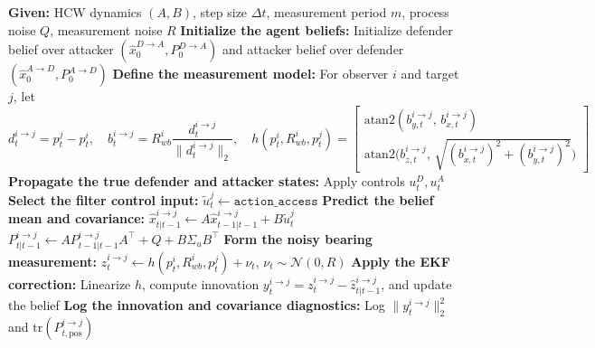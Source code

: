 \begin{algorithm}[H]
\caption{Agent-Centric Bearing-Only Kalman Filter Update}
\label{alg:kf-methodology}
\begin{algorithmic}[1]
\State \textbf{Given:} HCW dynamics $(A,B)$, step size $\Delta t$, measurement period $m$, process noise $Q$, measurement noise $R$
\State \textbf{Initialize the agent beliefs:}
\State \hspace{1em} Initialize defender belief over attacker $(\hat{x}^{D\to A}_0,P^{D\to A}_0)$ and attacker belief over defender $(\hat{x}^{A\to D}_0,P^{A\to D}_0)$
\State \textbf{Define the measurement model:}
\State \hspace{1em} For observer $i$ and target $j$, let
\[
d_t^{i\to j}=p_t^j-p_t^i,\quad
b_t^{i\to j}=R_{wb}^i\frac{d_t^{i\to j}}{\|d_t^{i\to j}\|_2},\quad
h(p_t^i,R_{wb}^i,p_t^j)=
\begin{bmatrix}
\mathrm{atan2}(b_{y,t}^{i\to j},\,b_{x,t}^{i\to j})\\[2pt]
\mathrm{atan2}\!\big(b_{z,t}^{i\to j},\,\sqrt{(b_{x,t}^{i\to j})^2+(b_{y,t}^{i\to j})^2}\big)
\end{bmatrix}
\]
  \State \textbf{Propagate the true defender and attacker states:}
  \State \hspace{1em} Apply controls $u_t^{D},u_t^{A}$
    \State \textbf{Select the filter control input:}
    \State \hspace{1em} $\tilde{u}_t^j\leftarrow \texttt{action\_access}$
    \State \textbf{Predict the belief mean and covariance:}
    \State \hspace{1em} $\hat{x}_{t|t-1}^{i\to j}\leftarrow A\hat{x}_{t-1|t-1}^{i\to j}+B\tilde{u}_t^j$
    \State \hspace{1em} $P_{t|t-1}^{i\to j}\leftarrow A P_{t-1|t-1}^{i\to j} A^\top + Q + B\Sigma_u B^\top$
      \State \textbf{Form the noisy bearing measurement:}
      \State \hspace{1em} $z_t^{i\to j}\leftarrow h(p_t^i,R_{wb}^i,p_t^j)+\nu_t$, $\nu_t\sim\mathcal{N}(0,R)$
      \State \textbf{Apply the EKF correction:}
      \State \hspace{1em} Linearize $h$, compute innovation $y_t^{i\to j}=z_t^{i\to j}-\hat{z}_{t|t-1}^{i\to j}$, and update the belief
      \State \textbf{Log the innovation and covariance diagnostics:}
      \State \hspace{1em} Log $\|y_t^{i\to j}\|_2^2$ and $\mathrm{tr}(P^{i\to j}_{t,\mathrm{pos}})$
    \EndIf

\end{algorithmic}
\end{algorithm}
